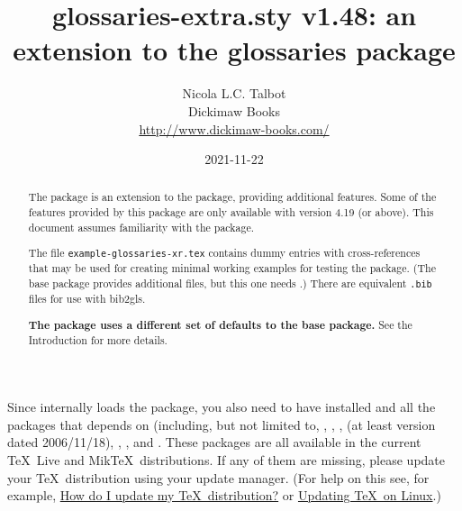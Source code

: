 \documentclass[report,inlinetitle,noprint]{nlctdoc}
\begin{document}
\DeleteShortVerb{\|}

 \title{glossaries-extra.sty v1.48:
 an extension to the glossaries package}
 \author{Nicola L.C. Talbot\\[10pt]
Dickimaw Books\\
\url{http://www.dickimaw-books.com/}}

 \date{2021-11-22}
 \maketitle

\begin{abstract}
The  package is an extension to the
 package, providing additional features.
Some of the features provided by this package are only available
with  version 4.19 (or above).
This document assumes familiarity with the  package.

The file \nolinkurl{example-glossaries-xr.tex} contains dummy
entries with cross-references that may be used for creating
minimal working examples for testing the 
package. (The base  package provides additional files,
but this one needs .) There are equivalent
\texttt{.bib} files for use with \gls{bib2gls}.

\textbf{The  package uses a different set
of defaults to the base  package.} See the
Introduction for more details.
\end{abstract}

\begin{important}
Since  internally loads the 
package, you also need to have  installed and
all the packages that  depends on (including, but
not limited to, , , , 
 (at least version dated 2006/11/18), ,
,  and . These
packages are all available in the current \TeX\ Live and Mik\TeX\
distributions. If any of them are missing, please update your
\TeX\ distribution using your update manager.
(For help on this see, for example,
\href{http://tex.stackexchange.com/questions/55437/how-do-i-update-my-tex-distribution}{How do I update my \TeX\ distribution?}
or
\href{http://tex.stackexchange.com/questions/14925/updating-tex-on-linux}{Updating
\TeX\ on Linux}.)
\end{important}
\end{document}
